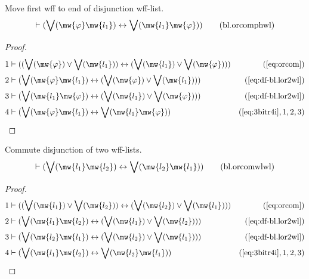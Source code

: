 \begin{lemma} Move first wff to end of disjunction
wff-list.
\begin{align}
\vdash ( \bigvee( \mw{\varphi} \mw{l_1} ) \leftrightarrow \bigvee( \mw{l_1} \mw{\varphi}
    ) )\label{eq:bl.orcomphwl}\tag{bl.orcomphwl}
\end{align}
\end{lemma}

\begin{proof}
\begin{align}
  1 & \vdash ( ( \bigvee( \mw{\varphi} ) \vee \bigvee( \mw{l_1} ) )
    \leftrightarrow ( \bigvee( \mw{l_1} ) \vee \bigvee(
    \mw{\varphi} ) ) )&(\mbox{\ref{eq:orcom}})\notag
  \\ 2 & \vdash ( \bigvee( \mw{\varphi} \mw{l_1} ) \leftrightarrow ( \bigvee(
    \mw{\varphi} ) \vee \bigvee( \mw{l_1} ) )
    )&(\mbox{\ref{eq:df-bl.lor2wl}})\notag
  \\ 3 & \vdash ( \bigvee( \mw{l_1} \mw{\varphi} ) \leftrightarrow ( \bigvee(
    \mw{l_1} ) \vee \bigvee( \mw{\varphi} ) )
    )&(\mbox{\ref{eq:df-bl.lor2wl}})\notag
  \\ 4 & \vdash ( \bigvee( \mw{\varphi} \mw{l_1} ) \leftrightarrow \bigvee(
    \mw{l_1} \mw{\varphi} )
    )&(\mbox{\ref{eq:3bitr4i}},1,2,3)\notag
\end{align}
\end{proof}

\begin{lemma} Commute disjunction of two wff-lists.
\begin{align}
\vdash ( \bigvee( \mw{l_1} \mw{l_2} ) \leftrightarrow \bigvee( \mw{l_2}
    \mw{l_1} ) )\label{eq:bl.orcomwlwl}\tag{bl.orcomwlwl}
\end{align}
\end{lemma}

\begin{proof}
\begin{align}
  1 & \vdash ( ( \bigvee( \mw{l_1} ) \vee \bigvee( \mw{l_2} ) )
    \leftrightarrow ( \bigvee( \mw{l_2} ) \vee \bigvee(
    \mw{l_1} ) ) )&(\mbox{\ref{eq:orcom}})\notag
  \\ 2 & \vdash ( \bigvee( \mw{l_1} \mw{l_2} ) \leftrightarrow ( \bigvee(
    \mw{l_1} ) \vee \bigvee( \mw{l_2} ) )
    )&(\mbox{\ref{eq:df-bl.lor2wl}})\notag
  \\ 3 & \vdash ( \bigvee( \mw{l_2} \mw{l_1} ) \leftrightarrow ( \bigvee(
    \mw{l_2} ) \vee \bigvee( \mw{l_1} ) )
    )&(\mbox{\ref{eq:df-bl.lor2wl}})\notag
  \\ 4 & \vdash ( \bigvee( \mw{l_1} \mw{l_2} ) \leftrightarrow \bigvee(
    \mw{l_2} \mw{l_1} )
    )&(\mbox{\ref{eq:3bitr4i}},1,2,3)\notag
\end{align}
\end{proof}

